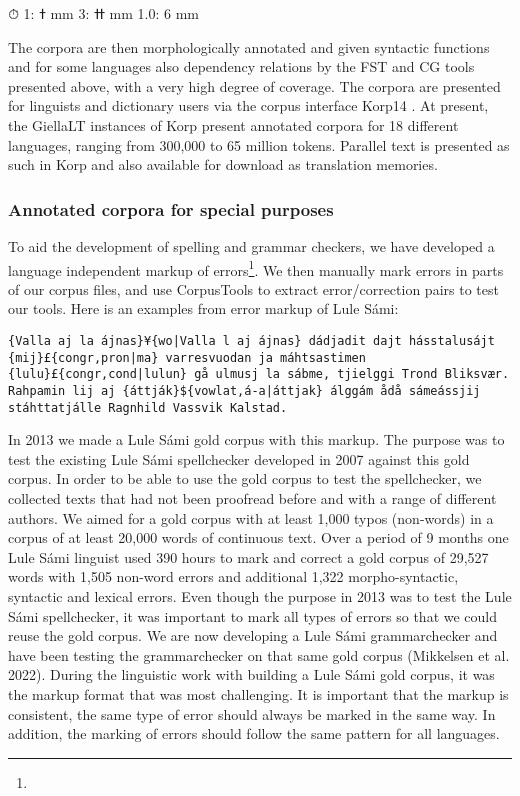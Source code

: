 \documentclass[free]{flammie}
\begin{document}
⏱
ߙ :1 mm
ߚ :3 mm
1.0: 6 mm

The corpora are then morphologically annotated and given syntactic functions and for
some languages also dependency relations by the FST and CG tools presented above, with
a very high degree of coverage. The corpora are presented for linguists and dictionary users
via the corpus interface Korp14
. At present, the GiellaLT instances of Korp present annotated corpora for 18 different languages, ranging from 300,000 to 65 million tokens. Parallel text is presented as such in Korp and also available for download as translation memories.


\subsubsection{Annotated corpora for special purposes}

To aid the development of spelling and grammar checkers, we have developed a language
independent markup of errors\footnote{}. We then manually mark errors in parts of our corpus files,
and use CorpusTools to extract error/correction pairs to test our tools. Here is an examples
from error markup of Lule Sámi:

\begin{verbatim}
{Valla aj la ájnas}¥{wo|Valla l aj ájnas} dádjadit dajt hásstalusájt {mij}£{congr,pron|ma} varresvuodan ja máhtsastimen
{lulu}£{congr,cond|lulun} gå ulmusj la sábme, tjielggi Trond Bliksvær.
Rahpamin lij aj {áttják}${vowlat,á-a|áttjak} álggám ådå sámeássjij stáhttatjálle Ragnhild Vassvik Kalstad.
\end{verbatim}

In 2013 we made a Lule Sámi gold corpus with this markup. The purpose was to test the
existing Lule Sámi spellchecker developed in 2007 against this gold corpus. In order to be
able to use the gold corpus to test the spellchecker, we collected texts that had not been
proofread before and with a range of different authors. We aimed for a gold corpus with at
least 1,000 typos (non-words) in a corpus of at least 20,000 words of continuous text. Over
a period of 9 months one Lule Sámi linguist used 390 hours to mark and correct a gold
corpus of 29,527 words with 1,505 non-word errors and additional 1,322 morpho-syntactic,
syntactic and lexical errors. Even though the purpose in 2013 was to test the Lule Sámi
spellchecker, it was important to mark all types of errors so that we could reuse the gold
corpus. We are now developing a Lule Sámi grammarchecker and have been testing the
grammarchecker on that same gold corpus (Mikkelsen et al. 2022). During the linguistic
work with building a Lule Sámi gold corpus, it was the markup format that was most challenging. It is important that the markup is consistent, the same type of error should always
be marked in the same way. In addition, the marking of errors should follow the same
pattern for all languages.
\end{document}
